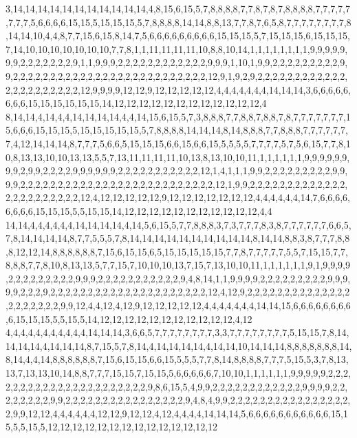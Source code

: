3,14,14,14,14,14,14,14,14,14,14,14,4,8,15,6,15,5,7,8,8,8,8,7,7,8,7,8,7,8,8,8,8,7,7,7,7,7,7,7,7,5,6,6,6,6,15,15,5,15,15,15,5,7,8,8,8,8,14,14,8,8,13,7,7,8,7,6,5,8,7,7,7,7,7,7,7,7,8,14,14,10,4,4,8,7,7,15,6,15,8,14,7,5,6,6,6,6,6,6,6,6,6,15,15,15,5,7,15,15,15,6,15,15,15,7,14,10,10,10,10,10,10,10,7,7,8,1,1,11,11,11,11,10,8,8,10,14,1,1,1,1,1,1,1,1,9,9,9,9,9,9,9,2,2,2,2,2,2,2,9,1,1,9,9,9,2,2,2,2,2,2,2,2,2,2,2,2,9,9,9,1,10,1,9,9,2,2,2,2,2,2,2,2,2,9,9,2,2,2,2,2,2,2,2,2,2,2,2,2,2,2,2,2,2,2,2,2,2,2,2,2,2,12,9,1,9,2,9,2,2,2,2,2,2,2,2,2,2,2,2,2,2,2,2,2,2,2,2,2,2,12,9,9,9,9,12,12,9,12,12,12,12,12,4,4,4,4,4,4,4,14,14,14,3,6,6,6,6,6,6,6,6,15,15,15,15,15,15,14,12,12,12,12,12,12,12,12,12,12,12,12,4
8,14,14,4,14,4,4,14,14,14,14,4,4,14,15,6,15,5,7,3,8,8,8,7,7,8,8,7,8,8,7,8,7,7,7,7,7,7,7,15,6,6,6,15,15,15,5,15,15,15,15,15,5,7,8,8,8,8,14,14,14,8,14,8,8,8,7,7,8,8,8,7,7,7,7,7,7,7,4,12,14,14,14,8,7,7,7,5,6,6,5,15,15,15,6,6,15,6,6,15,5,5,5,5,7,7,7,7,5,7,5,6,15,7,7,8,10,8,13,13,10,10,13,13,5,5,7,13,11,11,11,11,10,13,8,13,10,10,11,1,1,1,1,1,1,9,9,9,9,9,9,9,9,2,9,9,2,2,2,2,9,9,9,9,9,9,2,2,2,2,2,2,2,2,2,2,2,12,1,4,1,1,1,9,9,2,2,2,2,2,2,2,2,2,9,9,9,9,2,2,2,2,2,2,2,2,2,2,2,2,2,2,2,2,2,2,2,2,2,2,2,2,2,2,12,1,9,9,2,2,2,2,2,2,2,2,2,2,2,2,2,2,2,2,2,2,2,2,2,2,2,12,4,12,12,12,12,12,9,12,12,12,12,12,12,12,4,4,4,4,4,4,14,7,6,6,6,6,6,6,6,6,15,15,15,5,5,15,15,14,12,12,12,12,12,12,12,12,12,12,12,4,4
14,14,4,4,4,4,4,4,14,14,14,14,4,14,5,6,15,5,7,7,8,8,8,3,7,3,7,7,7,8,3,8,7,7,7,7,7,7,6,6,5,7,8,14,14,14,14,8,7,7,5,5,5,7,8,14,14,14,14,14,14,14,14,14,14,8,14,14,8,8,3,8,7,7,7,8,8,8,12,12,14,8,8,8,8,8,8,7,15,6,15,15,6,5,15,15,15,15,15,7,7,8,7,7,7,7,7,5,5,7,15,15,7,7,8,8,8,7,7,8,10,8,13,13,5,7,7,15,7,10,10,10,13,7,15,7,13,10,10,11,1,1,1,1,1,1,9,1,9,9,9,9,2,2,2,2,2,2,2,2,2,9,9,9,2,2,2,2,2,2,2,2,2,2,2,9,4,8,14,1,1,9,9,9,9,2,2,2,2,2,2,2,2,2,9,9,9,9,9,2,2,2,9,2,2,2,2,2,2,2,2,2,2,2,2,2,2,2,2,2,2,2,2,2,12,4,12,9,2,2,2,2,2,2,2,2,2,2,2,2,2,2,2,2,2,2,2,2,2,9,9,12,4,4,12,4,12,9,12,12,12,12,12,4,4,4,4,4,4,4,14,14,15,6,6,6,6,6,6,6,6,6,15,15,15,5,5,15,5,14,12,12,12,12,12,12,12,12,12,12,12,4,12
4,4,4,4,4,4,4,4,4,4,4,14,14,14,3,6,6,5,7,7,7,7,7,7,7,7,3,3,7,7,7,7,7,7,7,7,5,15,15,7,8,14,14,14,14,4,14,14,14,8,7,15,5,7,8,14,4,14,14,14,14,4,14,14,10,14,14,14,8,8,8,8,8,8,8,14,8,14,4,4,14,8,8,8,8,8,8,7,15,6,15,15,6,6,15,5,5,5,7,7,8,14,8,8,8,8,7,7,7,5,15,5,3,7,8,13,13,7,13,13,10,14,8,8,7,7,7,15,15,7,15,15,5,6,6,6,6,6,7,10,10,1,1,1,1,1,1,9,9,9,9,9,2,2,2,2,2,2,2,2,2,2,2,2,2,2,2,2,2,2,2,2,2,2,9,8,6,15,5,4,9,9,2,2,2,2,2,2,2,2,2,2,2,2,9,9,9,9,2,2,2,2,2,2,2,2,9,9,2,2,2,2,2,2,2,2,2,2,2,2,2,2,2,2,9,4,8,4,9,9,2,2,2,2,2,2,2,2,2,2,2,2,2,2,2,2,2,9,9,12,12,4,4,4,4,4,4,12,12,9,12,12,4,12,4,4,4,4,14,14,14,5,6,6,6,6,6,6,6,6,6,6,6,15,15,5,5,15,5,12,12,12,12,12,12,12,12,12,12,12,12,12,12
